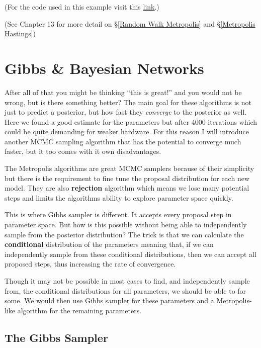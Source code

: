 \documentclass[12pt,twoside]{report}   %
\newcommand{\bb}{\textbf}
\newcommand{\ti}{\textit}
\begin{document}
(For the code used in this example visit this \href{https://github.com/iMikeT/MathProject2/tree/master/R%20Code/Metropolis/Metropolis-Hastings%20Example}{link}.)

(See \cite{3} Chapter 13 for more detail on \S\ref{Random Walk Metropolis} and \S\ref{Metropolis Hastings})
\chapter{Gibbs \& Bayesian Networks}\label{Gibbs}

After all of that you might be thinking ``this is great!'' and you would not be wrong, but is there something better? The main goal for these algorithms is not just to predict a posterior, but how fast they \ti{converge} to the posterior as well. Here we found a good estimate for the parameters but after 4000 iterations which could be quite demanding for weaker hardware. For this reason I will introduce another MCMC sampling algorithm that has the potential to converge much faster, but it too comes with it own disadvantages.

The Metropolis algorithms are great MCMC samplers because of their simplicity but there is the requirement to fine tune the proposal distribution for each new model. They are also \bb{rejection} algorithm which means we lose many potential steps and limits the algorithms ability to explore parameter space quickly.

This is where Gibbs sampler is different. It accepts every proposal step in parameter space. But how is this possible without being able to independently sample from the posterior distribution? The trick is that we can calculate the \bb{conditional} distribution of the parameters meaning that, if we can independently sample from these conditional distributions, then we can accept all proposed steps, thus increasing the rate of convergence.

Though it may not be possible in most cases to find, and independently sample from,  the conditional distributions for all parameters, we should be able to for some. We would then use Gibbs sampler for these parameters and a Metropolis-like algorithm for the remaining parameters.

\section{The Gibbs Sampler}\label{The Gibbs Sampler}
\vspace{-0.4in}
\underline{\hspace{6.2in}}
\vspace{-0.1in}
\end{document}
